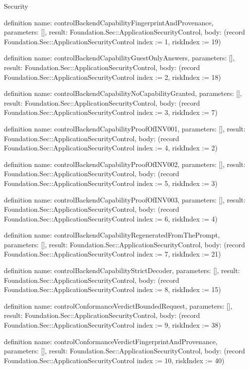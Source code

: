 \begin{lexlean}{Security}
\begin{semanticmodule}
definition{
  name: controlBackendCapabilityFingerprintAndProvenance,
  parameters: [],
  result: Foundation.Sec::ApplicationSecurityControl,
  body: (record Foundation.Sec::ApplicationSecurityControl {index := 1, riskIndex := 19})
}

definition{
  name: controlBackendCapabilityGuestOnlyAnswers,
  parameters: [],
  result: Foundation.Sec::ApplicationSecurityControl,
  body: (record Foundation.Sec::ApplicationSecurityControl {index := 2, riskIndex := 18})
}

definition{
  name: controlBackendCapabilityNoCapabilityGranted,
  parameters: [],
  result: Foundation.Sec::ApplicationSecurityControl,
  body: (record Foundation.Sec::ApplicationSecurityControl {index := 3, riskIndex := 7})
}

definition{
  name: controlBackendCapabilityProofOfINV001,
  parameters: [],
  result: Foundation.Sec::ApplicationSecurityControl,
  body: (record Foundation.Sec::ApplicationSecurityControl {index := 4, riskIndex := 2})
}

definition{
  name: controlBackendCapabilityProofOfINV002,
  parameters: [],
  result: Foundation.Sec::ApplicationSecurityControl,
  body: (record Foundation.Sec::ApplicationSecurityControl {index := 5, riskIndex := 3})
}

definition{
  name: controlBackendCapabilityProofOfINV003,
  parameters: [],
  result: Foundation.Sec::ApplicationSecurityControl,
  body: (record Foundation.Sec::ApplicationSecurityControl {index := 6, riskIndex := 4})
}

definition{
  name: controlBackendCapabilityRegeneratedFromThePrompt,
  parameters: [],
  result: Foundation.Sec::ApplicationSecurityControl,
  body: (record Foundation.Sec::ApplicationSecurityControl {index := 7, riskIndex := 21})
}

definition{
  name: controlBackendCapabilityStrictDecoder,
  parameters: [],
  result: Foundation.Sec::ApplicationSecurityControl,
  body: (record Foundation.Sec::ApplicationSecurityControl {index := 8, riskIndex := 15})
}

definition{
  name: controlConformanceVerdictBoundedRequest,
  parameters: [],
  result: Foundation.Sec::ApplicationSecurityControl,
  body: (record Foundation.Sec::ApplicationSecurityControl {index := 9, riskIndex := 38})
}

definition{
  name: controlConformanceVerdictFingerprintAndProvenance,
  parameters: [],
  result: Foundation.Sec::ApplicationSecurityControl,
  body: (record Foundation.Sec::ApplicationSecurityControl {index := 10, riskIndex := 40})
}


\end{semanticmodule}
\end{lexlean}
